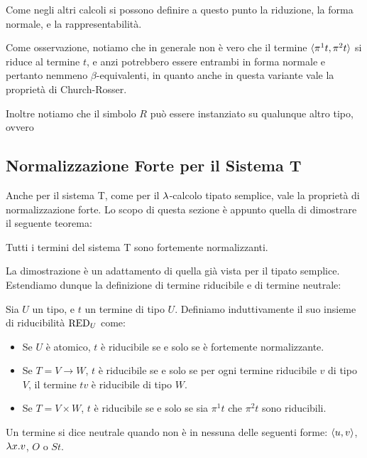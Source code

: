 \documentclass[]{marticle}
\begin{document}
Come negli altri calcoli si possono definire a questo punto la riduzione, la
forma normale, e la rappresentabilit\`a.

Come osservazione, notiamo che in generale non \`e vero che il termine
$\langle \pi^1t, \pi^2t \rangle$ si riduce al termine $t$, e anzi potrebbero essere
entrambi in forma normale e pertanto nemmeno $\beta$-equivalenti, in quanto
anche in questa variante vale la propriet\`a di Church-Rosser.

Inoltre notiamo che il simbolo $R$ pu\`o essere instanziato su qualunque altro
tipo, ovvero 

\subsection{Normalizzazione Forte per il Sistema T}

Anche per il sistema T, come per il $\lambda$-calcolo tipato semplice, vale la
propriet\`a di normalizzazione forte. Lo scopo di questa sezione \`e appunto
quella di dimostrare il seguente teorema:
\begin{block}[Teorema]
    Tutti i termini del sistema T sono fortemente normalizzanti.
\end{block}

La dimostrazione \`e un adattamento di quella gi\`a vista per il tipato
semplice. Estendiamo dunque la definizione di termine riducibile e di termine
neutrale:
\begin{block}[Definizione]
    Sia $U$ un tipo, e $t$ un termine di tipo $U$. Definiamo induttivamente il
    suo insieme di riducibilit\`a $\text{RED}_{U}$ come:
    \begin{itemize}
        \item Se $U$ \`e atomico, $t$ \`e riducibile se e solo se \`e fortemente
            normalizzante.
        \item Se $T = V \rightarrow W$, $t$ \`e riducibile se e solo se per ogni
            termine riducibile $v$ di tipo $V$, il termine $tv$ \`e riducibile
            di tipo $W$.
        \item Se $T = V \times W$, $t$ \`e riducibile se e solo se sia $\pi^1
            t$ che $\pi^2 t$ sono riducibili.
    \end{itemize}
\end{block}

\begin{block}[Definizione]
    Un termine si dice neutrale quando non \`e in nessuna delle seguenti forme:
    $\langle u,v \rangle$, $\lambda x. v$, $O$ o $S t$.
\end{block}
\end{document}
